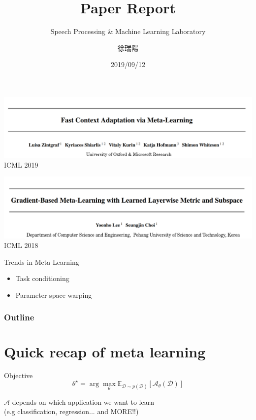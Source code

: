 \documentclass{beamer}
\title{Paper Report}
\subtitle{\textcolor[rgb]{0.00,0.50,1.00}{{Speech Processing \& Machine Learning Laboratory}}}
\author{徐瑞陽}
\date{2019/09/12}
\begin{document}
\begin{frame}
\maketitle
\end{frame}


\begin{frame}
  \includegraphics[width=\textwidth]{fig/CAVIA.png}
  \center ICML 2019
\end{frame}

\begin{frame}
  \includegraphics[width=\textwidth]{fig/title.png}
  \center ICML 2018
\end{frame}

\begin{frame}{Trends in Meta Learning}
  \begin{itemize}
    \item Task conditioning
    \item Parameter space warping
  \end{itemize}
\end{frame}

\begin{frame}
\frametitle{Outline}
\tableofcontents
\end{frame}

\section{Quick recap of meta learning}

\begin{frame}{Objective}
\[ \theta^\star = \arg \max_\theta \mathbb{E}_{\mathcal{D} \sim p(\mathcal{D}) }[\mathcal{A}_\theta(\mathcal{D})]\]

$\mathcal{A}$ depends on which application we want to learn \\ 
(e.g classification, regression... and MORE!!)
  
\end{frame}
\end{document}
